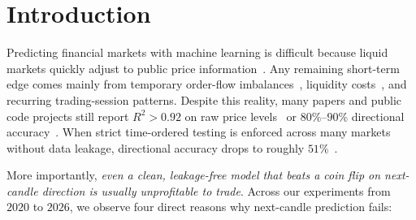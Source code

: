 \documentclass{article}
\begin{document}
\begin{abstract}
\end{abstract}

\section{Introduction}
\label{sec:intro}

Predicting financial markets with machine learning is difficult because liquid markets quickly adjust to public price information~\citep{Fama1970}. Any remaining short-term edge comes mainly from temporary order-flow imbalances~\citep{Kyle1985}, liquidity costs~\citep{Amihud2002}, and recurring trading-session patterns. Despite this reality, many papers and public code projects still report $R^2 > 0.92$ on raw price levels~\citep{Islam2025IJAES} or $80\%$--$90\%$ directional accuracy~\citep{Bansal2022}. When strict time-ordered testing is enforced across many markets without data leakage, directional accuracy drops to roughly $51\%$~\citep{Bustos2025}.

More importantly, \emph{even a clean, leakage-free model that beats a coin flip on next-candle direction is usually unprofitable to trade}. Across our experiments from $2020$ to $2026$, we observe four direct reasons why next-candle prediction fails:
\end{document}
